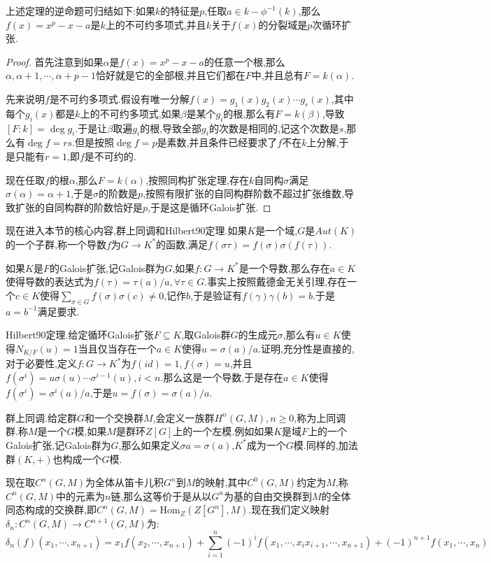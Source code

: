 上述定理的逆命题可归结如下:如果$k$的特征是$p$,任取$a\in k-\phi^{-1}(k)$,那么$f(x)=x^p-x-a$是$k$上的不可约多项式,并且$k$关于$f(x)$的分裂域是$p$次循环扩张.
\begin{proof}
	
	首先注意到如果$\alpha$是$f(x)=x^p-x-a$的任意一个根,那么$\alpha,\alpha+1,\cdots,\alpha+p-1$恰好就是它的全部根,并且它们都在$F$中,并且总有$F=k(\alpha)$.
	
	先来说明$f$是不可约多项式.假设有唯一分解$f(x)=g_1(x)g_2(x)\cdots g_r(x)$,其中每个$g_i(x)$都是$k$上的不可约多项式,如果$\beta$是某个$g_i$的根,那么有$F=k(\beta)$,导致$[F:k]=\deg g_i$.于是让$\beta$取遍$g_i$的根,导致全部$g_i$的次数是相同的,记这个次数是$s$,那么有$\deg f=rs$.但是按照$\deg f=p$是素数,并且条件已经要求了$f$不在$k$上分解,于是只能有$r=1$,即$f$是不可约的.
	
	现在任取$f$的根$\alpha$,那么$F=k(\alpha)$,按照同构扩张定理,存在$k$自同构$\sigma$满足$\sigma(\alpha)=\alpha+1$,于是$\sigma$的阶数是$p$,按照有限扩张的自同构群阶数不超过扩张维数,导致扩张的自同构群的阶数恰好是$p$,于是这是循环Galois扩张.
\end{proof}



现在进入本节的核心内容,群上同调和Hilbert90定理.如果$K$是一个域,$G$是$Aut(K)$的一个子群,称一个导数$f$为$G\to K^*$的函数,满足$f(\sigma\tau)=f(\sigma)\sigma(f(\tau))$.

如果$K$是$F$的Galois扩张,记Galois群为$G$,如果$f:G\to K^*$是一个导数,那么存在$a\in K$使得导数的表达式为$f(\tau)=\tau(a)/a,\forall \tau\in G$.事实上按照戴德金无关引理,存在一个$c\in K$使得$\sum_{\sigma\in G}f(\sigma)\sigma(c)\not=0$,记作$b$,于是验证有$f(\gamma)\gamma(b)=b$.于是$a=b^{-1}$满足要求.

Hilbert90定理.给定循环Galois扩张$F\subseteq K$,取Galois群$G$的生成元$\sigma$,那么有$u\in K$使得$N_{K/F}(u)=1$当且仅当存在一个$a\in K$使得$u=\sigma(a)/a$.证明,充分性是直接的,对于必要性,定义$f:G\to K^*$为$f(id)=1,f(\sigma)=u$,并且$f(\sigma^i)=u\sigma(u)\cdots\sigma^{i-1}(u),i<n$.那么这是一个导数,于是存在$a\in K$使得$f(\sigma^i)=\sigma^i(a)/a$,于是$u=f(\sigma)=\sigma(a)/a$.

群上同调.给定群$G$和一个交换群$M$,会定义一族群$H^n(G,M),n\ge0$,称为上同调群.称$M$是一个$G$模,如果$M$是群环$Z[G]$上的一个左模.例如如果$K$是域$F$上的一个Galois扩张,记Galois群为$G$,那么如果定义$\sigma a=\sigma(a)$,$K^*$成为一个$G$模.同样的,加法群$(K,+)$也构成一个$G$模.

现在取$C^n(G,M)$为全体从笛卡儿积$G^n$到$M$的映射,其中$C^0(G,M)$约定为$M$,称$C^n(G,M)$中的元素为$n$链,那么这等价于是从以$G^n$为基的自由交换群到$M$的全体同态构成的交换群,即$C^n(G,M)=\mathrm{Hom}_Z(Z[G^n],M)$.现在我们定义映射$\delta_n:C^n(G,M)\to C^{n+1}(G,M)$为:
$$\delta_n(f)(x_1,\cdots,x_{n+1})=x_1f(x_2,\cdots,x_{n+1})
+\sum_{i=1}^{n}(-1)^if(x_1,\cdots,x_ix_{i+1},\cdots,x_{n+1})
+(-1)^{n+1}f(x_1,\cdots,x_n)$$

